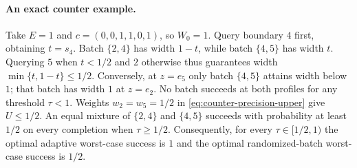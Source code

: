 \documentclass[12pt]{article}
\begin{document}
\paragraph{An exact counter example.}
Take $E=1$ and $c=(0,0,1,1,0,1)$, so $W_0=1$.
Query boundary $4$ first, obtaining $t=s_4$.
Batch $\{2,4\}$ has width $1-t$, while batch $\{4,5\}$ has width $t$.
Querying $5$ when $t<1/2$ and $2$ otherwise thus guarantees
width $\min\{t,1-t\}\leq1/2$.
Conversely, at $z=e_5$ only batch $\{4,5\}$ attains width below $1$;
that batch has width $1$ at $z=e_2$. No batch succeeds at both profiles
for any threshold $\tau<1$. Weights $w_2=w_5=1/2$ in
\eqref{eq:counter-precision-upper} give $U\leq1/2$.
An equal mixture of $\{2,4\}$ and $\{4,5\}$ succeeds with probability
at least $1/2$ on every completion when $\tau\geq1/2$.
Consequently, for every $\tau\in[1/2,1)$ the optimal adaptive worst-case
success is $1$ and the optimal randomized-batch worst-case success is
$1/2$.
\end{document}
